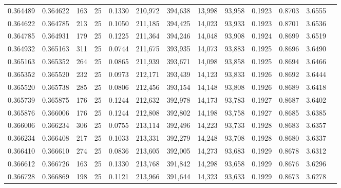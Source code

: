 \begin{tabular}{rrrrrrrrrrrrr}
0.364489 & 0.364622 &   163 &  25 &                                     0.1330 & 210,972 & 394,638 &  13,998 &  93,958 & 0.1923 & 0.8703 & 3.6555 \\
0.364622 & 0.364785 &   213 &  25 &                                     0.1050 & 211,185 & 394,425 &  14,023 &  93,933 & 0.1923 & 0.8701 & 3.6536 \\
0.364785 & 0.364931 &   179 &  25 &                                     0.1225 & 211,364 & 394,246 &  14,048 &  93,908 & 0.1924 & 0.8699 & 3.6519 \\
0.364932 & 0.365163 &   311 &  25 &                                     0.0744 & 211,675 & 393,935 &  14,073 &  93,883 & 0.1925 & 0.8696 & 3.6490 \\
0.365163 & 0.365352 &   264 &  25 &                                     0.0865 & 211,939 & 393,671 &  14,098 &  93,858 & 0.1925 & 0.8694 & 3.6466 \\
0.365352 & 0.365520 &   232 &  25 &                                     0.0973 & 212,171 & 393,439 &  14,123 &  93,833 & 0.1926 & 0.8692 & 3.6444 \\
0.365520 & 0.365738 &   285 &  25 &                                     0.0806 & 212,456 & 393,154 &  14,148 &  93,808 & 0.1926 & 0.8689 & 3.6418 \\
0.365739 & 0.365875 &   176 &  25 &                                     0.1244 & 212,632 & 392,978 &  14,173 &  93,783 & 0.1927 & 0.8687 & 3.6402 \\
0.365876 & 0.366006 &   176 &  25 &                                     0.1244 & 212,808 & 392,802 &  14,198 &  93,758 & 0.1927 & 0.8685 & 3.6385 \\
0.366006 & 0.366234 &   306 &  25 &                                     0.0755 & 213,114 & 392,496 &  14,223 &  93,733 & 0.1928 & 0.8683 & 3.6357 \\
0.366234 & 0.366408 &   217 &  25 &                                     0.1033 & 213,331 & 392,279 &  14,248 &  93,708 & 0.1928 & 0.8680 & 3.6337 \\
0.366410 & 0.366610 &   274 &  25 &                                     0.0836 & 213,605 & 392,005 &  14,273 &  93,683 & 0.1929 & 0.8678 & 3.6312 \\
0.366612 & 0.366726 &   163 &  25 &                                     0.1330 & 213,768 & 391,842 &  14,298 &  93,658 & 0.1929 & 0.8676 & 3.6296 \\
0.366728 & 0.366869 &   198 &  25 &                                     0.1121 & 213,966 & 391,644 &  14,323 &  93,633 & 0.1929 & 0.8673 & 3.6278 \\

\end{tabular}
